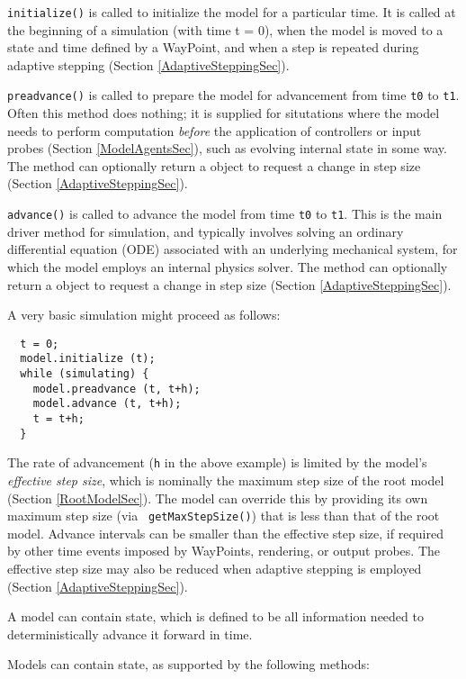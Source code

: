 \documentclass{article}
\begin{document}
{\tt initialize()} is called to initialize the model for a particular
time. It is called at the beginning of a simulation (with time t = 0),
when the model is moved to a state and time defined by a
WayPoint, and when a step is repeated during adaptive stepping
(Section \ref{AdaptiveSteppingSec}).

{\tt preadvance()} is called to prepare the model for advancement from
time {\tt t0} to {\tt t1}. Often this method does nothing; it is
supplied for situtations where the model needs to perform computation
{\it before} the application of controllers or input probes (Section
\ref{ModelAgentsSec}), such as evolving internal state in some way.
The method can optionally return a  object to
request a change in step size (Section \ref{AdaptiveSteppingSec}).

{\tt advance()} is called to advance the model from time {\tt t0} to
{\tt t1}. This is the main driver method for simulation, and typically
involves solving an ordinary differential equation (ODE) associated
with an underlying mechanical system, for which the model employs an
internal physics solver. The method can optionally return a
 object to request a change in step size
(Section \ref{AdaptiveSteppingSec}).

A very basic simulation might proceed as follows:

\begin{lstlisting}
  t = 0;
  model.initialize (t);
  while (simulating) {
    model.preadvance (t, t+h);
    model.advance (t, t+h);
    t = t+h;
  }
\end{lstlisting}

The rate of advancement ({\tt h} in the above example) is limited by
the model's {\it effective step size}, which is nominally the maximum
step size of the root model (Section \ref{RootModelSec}). The model
can override this by providing its own maximum step size (via {\tt
getMaxStepSize()}) that is less than that of the root model.  Advance
intervals can be smaller than the effective step size, if required by
other time events imposed by WayPoints, rendering, or output
probes. The effective step size may also be reduced when adaptive
stepping is employed (Section \ref{AdaptiveSteppingSec}).

A model can contain state, which is defined to be all information
needed to deterministically advance it forward in time.

Models can contain state, as supported by the following methods:
\end{document}

